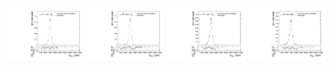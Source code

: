 \begin{figure}[htpb]
  \centering
  \includegraphics[width=0.2\textwidth]{fig/2Dfit/templateVsReco_GbuToWW2000_r0_MVV_mu_HP_nobb_LDy_linear.pdf}
  \includegraphics[width=0.2\textwidth]{fig/2Dfit/templateVsReco_GbuToWW2000_r0_MVV_mu_LP_nobb_LDy_linear.pdf}
  \includegraphics[width=0.2\textwidth]{fig/2Dfit/templateVsReco_GbuToWW2000_r0_MVV_mu_HP_nobb_HDy_linear.pdf}
  \includegraphics[width=0.2\textwidth]{fig/2Dfit/templateVsReco_GbuToWW2000_r0_MVV_mu_LP_nobb_HDy_linear.pdf}\\

\end{figure}
